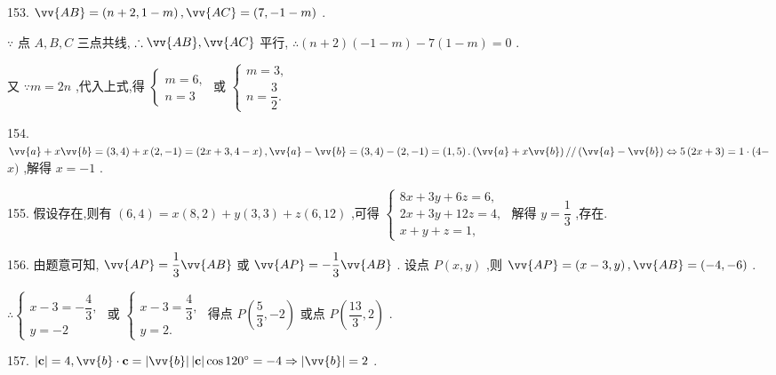 153. $\vv{AB} = \left( {n + 2,1 - m}\right) ,\vv{AC} = \left( {7, - 1 - m}\right)$ .

$\because$ 点 $A,B,C$ 三点共线, $\therefore \vv{AB},\vv{AC}$ 平行, $\therefore \left( {n + 2}\right) \left( {-1 - m}\right)  - 7\left( {1 - m}\right)  = 0$ .

又 $\because m = {2n}$ ,代入上式,得 $\left\{  \begin{array}{l} m = 6, \\  n = 3 \end{array}\right.$ 或 $\left\{  \begin{array}{l} m = 3, \\  n = \dfrac{3}{2}. \end{array}\right.$

154. $\vv{a} + x\vv{b} = \left( {3,4}\right)  + x\left( {2, - 1}\right)  = \left( {{2x} + 3,4 - x}\right) ,\vv{a} - \vv{b} = \left( {3,4}\right)  - \left( {2, - 1}\right)  = \left( {1,5}\right) .\left( {\vv{a} + x\vv{b}}\right) //\left( {\vv{a} - \vv{b}}\right)  \Leftrightarrow  5\left( {{2x} + 3}\right)  = 1 \cdot  (4 -$  $x)$ ,解得 $x =  - 1$ .

155. 假设存在,则有 $\left( {6,4}\right)  = x\left( {8,2}\right)  + y\left( {3,3}\right)  + z\left( {6,{12}}\right)$ ,可得 $\left\{  \begin{array}{l} {8x} + {3y} + {6z} = 6, \\  {2x} + {3y} + {12z} = 4, \\  x + y + z = 1, \end{array}\right.$ 解得 $y = \dfrac{1}{3}$ ,存在.

156. 由题意可知, $\vv{AP} = \dfrac{1}{3}\vv{AB}$ 或 $\vv{AP} =  - \dfrac{1}{3}\vv{AB}$ . 设点 $P\left( {x,y}\right)$ ,则 $\vv{AP} = \left( {x - 3,y}\right) ,\vv{AB} = \left( {-4, - 6}\right)$ .

$\therefore \left\{  \begin{array}{l} x - 3 =  - \dfrac{4}{3}, \\  y =  - 2 \end{array}\right.$ 或 $\left\{  \begin{array}{l} x - 3 = \dfrac{4}{3}, \\  y = 2. \end{array}\right.$ 得点 $P\left( {\dfrac{5}{3}, - 2}\right)$ 或点 $P\left( {\dfrac{13}{3},2}\right)$ .

157. $\left| \mathbf{c}\right|  = 4,\vv{b} \cdot  \mathbf{c} = \left| \vv{b}\right| \left| \mathbf{c}\right| \cos {120}^{ \circ  } =  - 4 \Rightarrow  \left| \vv{b}\right|  = 2$ .

